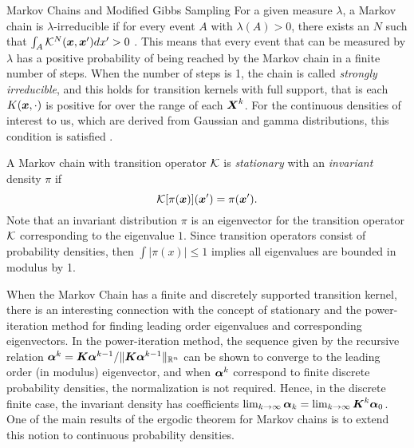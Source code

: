\begin{chapter}{Markov Chains and Modified Gibbs Sampling}
For a given measure $\lambda$, a Markov chain is $\lambda$-irreducible if for every event $A$ with $\lambda(A) > 0$, there exists an $N$ such that $\int_A \mathcal K^N(\mbox{\boldmath$x$},\mbox{\boldmath$x$}')dx'>0$ \citep{robert2013monte}. 
This means that every event that can be measured by $\lambda$ has a positive probability of being reached by the Markov chain in a finite number of steps.
When the number of steps is 1, the chain is called \emph{strongly irreducible}, and this holds for transition kernels with full support, that is each $K(\mbox{\boldmath$x$},\cdot)$ is positive for over the range of each $\mbox{\boldmath$X$}^k$.
For the continuous densities of interest to us, which are derived from Gaussian and gamma distributions, 
this condition is satisfied \citep{liu2008monte}.

A Markov chain with transition operator $\mathcal K$ is \emph{stationary} with an \emph{invariant} density $\pi$ if 
\begin{equation} \label{eq:stationarity}
  \mathcal K [\pi(\mbox{\boldmath$x$})](\mbox{\boldmath$x$}') = \pi(\mbox{\boldmath$x$}').
\end{equation}
Note that an invariant distribution $\pi$ is an eigenvector for the transition operator $\mathcal K$ corresponding to the eigenvalue $1$.
Since transition operators consist of probability densities, then $\int |\pi(x)| \le 1$ implies all eigenvalues are bounded in modulus by 1.

When the Markov Chain has a finite and discretely supported transition kernel, there is an interesting connection with the concept of stationary and the power-iteration method for finding leading order eigenvalues and corresponding eigenvectors.
In the power-iteration method, the sequence given by the recursive relation $\mbox{\boldmath$\alpha$}^k = \mbox{\boldmath$K$}\mbox{\boldmath$\alpha$}^{k-1}/\|\mbox{\boldmath$K$}\mbox{\boldmath$\alpha$}^{k-1}\|_{\mathbb R^n}$ can be shown to converge to the leading order (in modulus) eigenvector, and when $\mbox{\boldmath$\alpha$}^k$ correspond to finite discrete probability densities, the normalization is not required. 
Hence, in the discrete finite case, the invariant density has coefficients $\lim_{k\to \infty}\mbox{\boldmath$\alpha$}_k = \lim_{k\to \infty} \mbox{\boldmath$K$}^k \mbox{\boldmath$\alpha$}_0$.
One of the main results of the ergodic theorem for Markov chains is to extend this notion to continuous probability densities.


\end{chapter}
